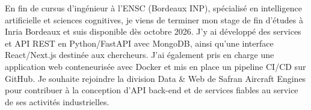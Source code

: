 
\begin{cvparagraph}
En fin de cursus d’ingénieur à l’ENSC (Bordeaux INP), spécialisé en intelligence artificielle et sciences cognitives, je viens de terminer mon stage de fin d’études à Inria Bordeaux et suis disponible dès octobre 2026. J’y ai développé des services et API REST en Python/FastAPI avec MongoDB, ainsi qu’une interface React/Next.js destinée aux chercheurs. J’ai également pris en charge une application web conteneurisée avec Docker et mis en place un pipeline CI/CD sur GitHub. Je souhaite rejoindre la division Data & Web de Safran Aircraft Engines pour contribuer à la conception d’API back-end et de services fiables au service de ses activités industrielles.
\end{cvparagraph}
